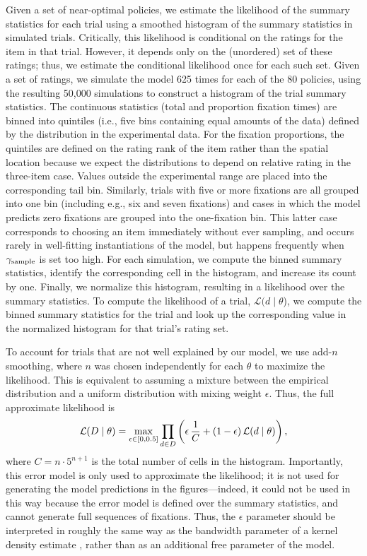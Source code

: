 Given a set of near-optimal policies, we estimate the likelihood of the summary statistics for each trial using a smoothed histogram of the summary statistics in simulated trials. Critically, this likelihood is conditional on the ratings for the item in that trial. However, it depends only on the (unordered) set of these ratings; thus, we estimate the conditional likelihood once for each such set. Given a set of ratings, we simulate the model 625 times for each of the 80 policies, using the resulting 50,000 simulations to construct a histogram of the trial summary statistics. The continuous statistics (total and proportion fixation times) are binned into quintiles (i.e., five bins containing equal amounts of the data) defined by the distribution in the experimental data. For the fixation proportions, the quintiles are defined on the rating rank of the item rather than the spatial location because we expect the distributions to depend on relative rating in the three-item case. Values outside the experimental range are placed into the corresponding tail bin. Similarly, trials with five or more fixations are all grouped into one bin (including e.g., six and seven fixations) and cases in which the model predicts zero fixations are grouped into the one-fixation bin. This latter case corresponds to choosing an item immediately without ever sampling, and occurs  rarely in well-fitting instantiations of the model, but happens frequently when $\gamma_\text{sample}$ is set too high. For each simulation, we compute the binned summary statistics, identify the corresponding cell in the histogram, and increase its count by one. Finally, we normalize this histogram, resulting in a likelihood over the summary statistics. To compute the likelihood of a trial, $\mathcal{L}(d \mid \theta$), we compute the binned summary statistics for the trial and look up the corresponding value in the normalized histogram for that trial's rating set.

 
To account for trials that are not well explained by our model, we use add-$n$ smoothing, where $n$ was chosen independently for each $\theta$ to maximize the likelihood. This is equivalent to assuming a mixture between the empirical distribution and a uniform distribution with mixing weight $\epsilon$. Thus, the full approximate likelihood is
\[
\mathcal{L}(D \mid \theta) = \max_{\epsilon\in[0,0.5]} 
  \prod_{d\in D} \left( 
    \epsilon\,\frac{1}{C}+(1-\epsilon)\,\mathcal{L}(d\mid\theta) 
  \right),
\]
where $C=n\cdot5^{n+1}$ is the total number of cells in the histogram. Importantly, this error model is only used to approximate the likelihood; it is not used for generating the model predictions in the figures---indeed, it could not be used in this way because the error model is defined over the summary statistics, and cannot generate full sequences of fixations. Thus, the $\epsilon$ parameter should be interpreted in roughly the same way as the bandwidth parameter of a kernel density estimate \citep{turner2014generalized}, rather than as an additional free parameter of the model.


